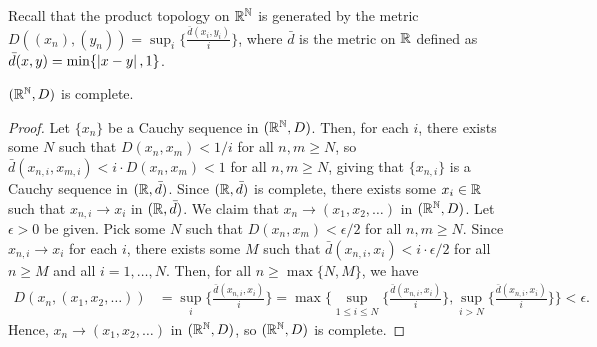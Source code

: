 Recall that the product topology on $\mathbb{R}^{\mathbb{N}}$ is generated by the metric $D((x_{n}),(y_{n})) = \sup_{i} \{ \frac{\bar{d}(x_{i},y_{i})}{i} \}$, where $\bar{d}$ is the metric on $\mathbb{R}$ defined as $\bar{d}(x,y) = \min\{\left| x-y \right|,1\}$.

\begin{theorem}
    $(\mathbb{R}^{\mathbb{N}},D)$ is complete.
\end{theorem}

\begin{proof}
    Let $\{x_{n}\}$ be a Cauchy sequence in $(\mathbb{R}^{\mathbb{N}},D)$. Then, for each $i$, there exists some $N$ such that $D(x_{n},x_{m}) < 1/i$ for all $n,m \geq N$, so $\bar{d}(x_{n,i},x_{m,i}) < i \cdot D(x_{n},x_{m}) < 1$ for all $n,m \geq N$, giving that $\{x_{n,i}\}$ is a Cauchy sequence in $(\mathbb{R},\bar{d})$. Since $(\mathbb{R},\bar{d})$ is complete, there exists some $x_{i} \in \mathbb{R}$ such that $x_{n,i} \to x_{i}$ in $(\mathbb{R},\bar{d})$. We claim that $x_{n} \to (x_{1},x_{2},\ldots)$ in $(\mathbb{R}^{\mathbb{N}},D)$. Let $\epsilon > 0$ be given. Pick some $N$ such that $D(x_{n},x_{m}) < \epsilon/2$ for all $n,m \geq N$. Since $x_{n,i} \to x_{i}$ for each $i$, there exists some $M$ such that $\bar{d}(x_{n,i},x_{i}) < i \cdot \epsilon/2$ for all $n \geq M$ and all $i = 1,\ldots,N$. Then, for all $n \geq \max\{N,M\}$, we have
    \begin{align}
        D(x_{n},(x_{1},x_{2},\ldots)) &= \sup_{i} \{\frac{\bar{d}(x_{n,i},x_{i})}{i}\} = \max\{\sup_{1 \leq i \leq N} \{\frac{\bar{d}(x_{n,i},x_{i})}{i}\}, \sup_{i > N} \{\frac{\bar{d}(x_{n,i},x_{i})}{i}\}\} < \epsilon.
    \end{align}
    Hence, $x_{n} \to (x_{1},x_{2},\ldots)$ in $(\mathbb{R}^{\mathbb{N}},D)$, so $(\mathbb{R}^{\mathbb{N}},D)$ is complete.
\end{proof}

